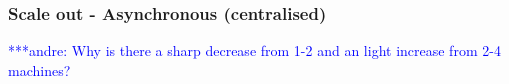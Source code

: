 \documentclass{rspublic}
\newcommand{\alnote}[1]{ {\textcolor{blue} { ***andre: #1 }}}
\newcommand{\alnote}[1]{}
\begin{document}
\subsubsection{Scale out - Asynchronous (centralised)}
\alnote{Why is there a sharp decrease from 1-2 and an light increase from 2-4 machines?}






\end{document}
